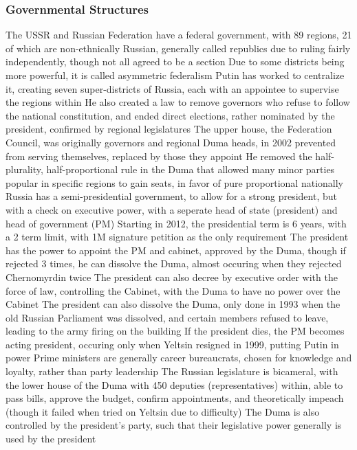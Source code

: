 \documentclass[11 pt, twoside]{article}
\newenvironment{outline*}
{
	\begin{outline}[enumerate]
	}
	{\end{outline}
}
\begin{document}
\subsubsection{Governmental Structures}
\begin{outline*}
\1 The USSR and Russian Federation have a federal government, with 89 regions, 21 of which are non-ethnically Russian, generally called republics due to ruling fairly independently, though not all agreed to be a section
\2 Due to some districts being more powerful, it is called asymmetric federalism
\1 Putin has worked to centralize it, creating seven super-districts of Russia, each with an appointee to supervise the regions within
\2 He also created a law to remove governors who refuse to follow the national constitution, and ended direct elections, rather nominated by the president, confirmed by regional legislatures
\2 The upper house, the Federation Council, was originally governors and regional Duma heads, in 2002 prevented from serving themselves, replaced by those they appoint
\2 He removed the half-plurality, half-proportional rule in the Duma that allowed many minor parties popular in specific regions to gain seats, in favor of pure proportional nationally
\1 Russia has a semi-presidential government, to allow for a strong president, but with a check on executive power, with a seperate head of state (president) and head of government (PM)
\2 Starting in 2012, the presidential term is 6 years, with a 2 term limit, with 1M signature petition as the only requirement
\2 The president has the power to appoint the PM and cabinet, approved by the Duma, though if rejected 3 times, he can dissolve the Duma, almost occuring when they rejected Chernomyrdin twice
\3 The president can also decree by executive order with the force of law, controlling the Cabinet, with the Duma to have no power over the Cabinet
\3 The president can also dissolve the Duma, only done in 1993 when the old Russian Parliament was dissolved, and certain members refused to leave, leading to the army firing on the building
\2 If the president dies, the PM becomes acting president, occuring only when Yeltsin resigned in 1999, putting Putin in power
\3 Prime ministers are generally career bureaucrats, chosen for knowledge and loyalty, rather than party leadership
\1 The Russian legislature is bicameral, with the lower house of the Duma with 450 deputies (representatives) within, able to pass bills, approve the budget, confirm appointments, and theoretically impeach (though it failed when tried on Yeltsin due to difficulty)
\2 The Duma is also controlled by the president's party, such that their legislative power generally is used by the president

\end{outline*}
\end{document}
